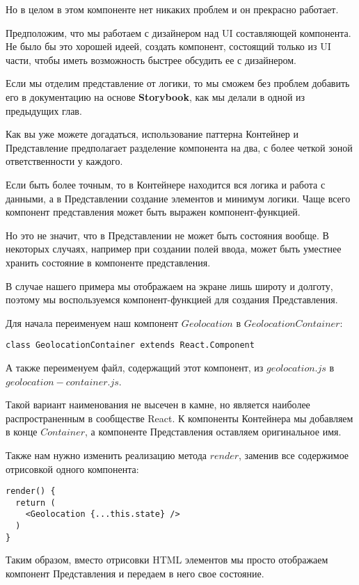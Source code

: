 Но в целом в этом компоненте нет никаких проблем и он прекрасно работает.

Предположим, что мы работаем с дизайнером над UI составляющей компонента. Не было бы это хорошей идеей, создать компонент, состоящий только из UI части, чтобы иметь возможность быстрее обсудить ее с дизайнером.

 Если мы отделим представление от логики, то мы сможем без проблем добавить его в документацию на основе \textbf{Storybook}, как мы делали в одной из предыдущих глав.
 
 Как вы уже можете догадаться, использование паттерна Контейнер и Представление предполагает разделение компонента на два, с более четкой зоной ответственности у каждого.
 
 Если быть более точным, то в Контейнере находится вся логика и работа с данными, а в Представлении создание элементов и минимум логики. Чаще всего компонент представления может быть выражен компонент-функцией.
 
 Но это не значит, что в Представлении не может быть состояния вообще. В некоторых случаях, например при создании полей ввода, может быть уместнее хранить состояние в компоненте представления.
 
 В случае нашего примера мы отображаем на экране лишь широту и долготу, поэтому мы воспользуемся компонент-функцией для создания Представления.
 
 Для начала переименуем наш компонент $Geolocation$ в $GeolocationContainer$:
 
\begin{lstlisting}
class GeolocationContainer extends React.Component
\end{lstlisting}

А также переименуем файл, содержащий этот компонент, из $geolocation.js$ в $geolocation-container.js$.

Такой вариант наименования не высечен в камне, но является наиболее распространенным в сообществе React. К компоненты Контейнера мы добавляем в конце $Container$, а компоненте Представления оставляем оригинальное имя.

Также нам нужно изменить реализацию метода $render$, заменив все содержимое отрисовкой одного компонента:

\begin{lstlisting}
render() {
  return (
    <Geolocation {...this.state} />
  )
}
\end{lstlisting}

Таким образом, вместо отрисовки HTML элементов мы просто отображаем компонент Представления и передаем в него свое состояние.


